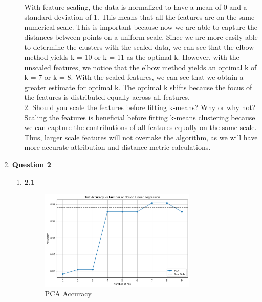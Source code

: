 \documentclass[12pt]{article}
\begin{document}
\begin{enumerate}
\begin{enumerate}
    With feature scaling, the data is normalized to have a mean of 0 and a standard deviation of 1. This means that all the features are on the same numerical scale. This is important because now we are able to capture the distances between points on a uniform scale. Since we are more easily able to determine the clusters with the scaled data, we can see that the elbow method
    yields k = 10 or k = 11 as the optimal k. However, with the unscaled features, we notice that the elbow method yields an optimal k of k = 7 or k = 8. With the scaled features, we can see that we obtain a greater estimate for optimal k. The optimal k shifts because the focus of the features is distributed equally across all features. \\


    2. Should you scale the features before fitting k-means? Why or why not? \\

    Scaling the features is beneficial before fitting k-means clustering because we can capture the contributions of all features equally on the same scale. Thus, larger scale features will not overtake the algorithm, as we will have more accurate attribution and distance metric calculations. 
  

  \end{enumerate}

  \item \textbf{Question 2}
  \begin{enumerate}
    \item \textbf{2.1}
    \begin{figure}[H]
      \centering 
      \includegraphics[width=0.75\textwidth]{2_1.png}
      \caption{PCA Accuracy}
    \end{figure}


\end{enumerate}
\end{enumerate}
\end{document}
